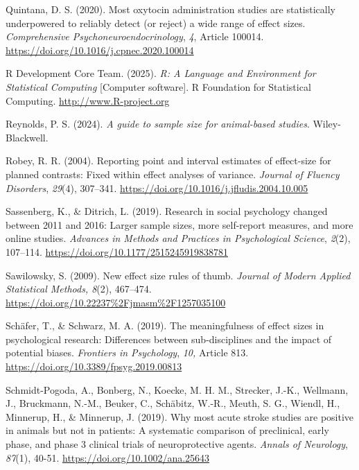 \documentclass[authordate, meta, issue]{jote-new-article}
\begin{document}
	Quintana, D. S. (2020). Most oxytocin administration studies are statistically underpowered to reliably detect (or reject) a wide range of effect sizes. \emph{Comprehensive Psychoneuroendocrinology}, \emph{4}, Article 100014. \url{https://doi.org/10.1016/j.cpnec.2020.100014}



	R Development Core Team. (2025). \emph{R: A Language and Environment for Statistical Computing} [Computer software]. R Foundation for Statistical Computing. \url{http://www.R-project.org}



	Reynolds, P. S. (2024). \emph{A guide to sample size for animal-based studies}. Wiley-Blackwell.



	Robey, R. R. (2004). Reporting point and interval estimates of effect-size for planned contrasts: Fixed within effect analyses of variance. \emph{Journal of Fluency Disorders}, \emph{29}(4), 307--341. \url{https://doi.org/10.1016/j.jfludis.2004.10.005}



	Sassenberg, K., \& Ditrich, L. (2019). Research in social psychology changed between 2011 and 2016: Larger sample sizes, more self-report measures, and more online studies. \emph{Advances in Methods and Practices in Psychological Science}, \emph{2}(2), 107--114. \url{https://doi.org/10.1177/2515245919838781}



	Sawilowsky, S. (2009). New effect size rules of thumb. \emph{Journal of Modern Applied Statistical Methods, 8}(2), 467--474. \url{https://doi.org/10.22237\%2Fjmasm\%2F1257035100}



	Schäfer, T., \& Schwarz, M. A. (2019). The meaningfulness of effect sizes in psychological research: Differences between sub-disciplines and the impact of potential biases. \emph{Frontiers in Psychology}, \emph{10, }Article 813. \url{https://doi.org/10.3389/fpsyg.2019.00813}



	Schmidt-Pogoda, A., Bonberg, N., Koecke, M. H. M., Strecker, J.-K., Wellmann, J., Bruckmann, N.-M., Beuker, C., Schäbitz, W.-R., Meuth, S. G., Wiendl, H., Minnerup, H., \& Minnerup, J. (2019). Why most acute stroke studies are positive in animals but not in patients: A systematic comparison of preclinical, early phase, and phase 3 clinical trials of neuroprotective agents. \emph{Annals of Neurology}, \emph{87}(1), 40-51. \url{https://doi.org/10.1002/ana.25643}
\end{document}
